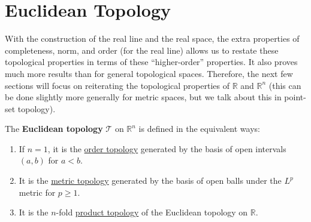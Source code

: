\section{Euclidean Topology} 

  With the construction of the real line and the real space, the extra properties of completeness, norm, and order (for the real line) allows us to restate these topological properties in terms of these ``higher-order'' properties. It also proves much more results than for general topological spaces. Therefore, the next few sections will focus on reiterating the topological properties of $\mathbb{R}$ and $\mathbb{R}^n$ (this can be done slightly more generally for metric spaces, but we talk about this in point-set topology). 

  \begin{theorem}
    \label{thm:euclidean-topology}
    The \textbf{Euclidean topology} $\mathscr{T}$ on $\mathbb{R}^n$ is defined in the equivalent ways: 
    \begin{enumerate}
      \item If $n = 1$, it is the \hyperref[pst-def:order-topology]{order topology} generated by the basis of open intervals $(a, b)$ for $a < b$. 
      \item It is the \hyperref[pst-def:metric-topology]{metric topology} generated by the basis of open balls under the $L^p$ metric for $p \geq 1$. 
      \item It is the $n$-fold \hyperref[pst-def:product-topology]{product topology} of the Euclidean topology on $\mathbb{R}$. 
    \end{enumerate}
  \end{theorem}
